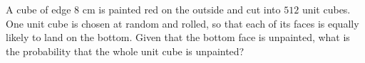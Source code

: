 A cube of edge $8$ cm is painted red on the outside and cut into $512$ unit cubes. One unit cube is chosen at random and rolled, so that each of its faces is equally likely to land on the bottom. Given that the bottom face is unpainted, what is the probability that the whole unit cube is unpainted?
